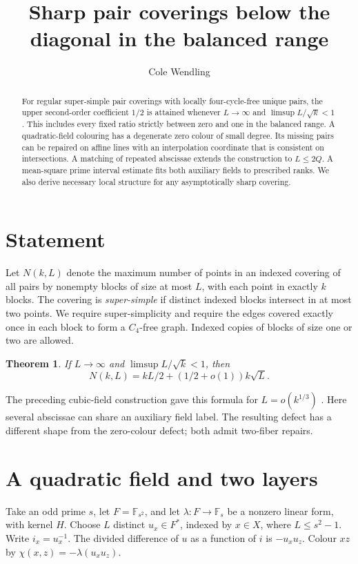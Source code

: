 \documentclass[10pt]{article}
\title{Sharp pair coverings below the diagonal in the balanced range}
\author{Cole Wendling}
\date{}
\newtheorem{theorem}{Theorem}
\newcommand{\F}{\mathbb F}
\begin{document}
\maketitle
\begin{abstract}
For regular super-simple pair coverings with locally four-cycle-free unique pairs, the upper second-order coefficient $1/2$ is attained whenever $L\to\infty$ and $\limsup L/\sqrt k<1$. This includes every fixed ratio strictly between zero and one in the balanced range. A quadratic-field colouring has a degenerate zero colour of small degree. Its missing pairs can be repaired on affine lines with an interpolation coordinate that is consistent on intersections. A matching of repeated abscissae extends the construction to $L\le2Q$. A mean-square prime interval estimate fits both auxiliary fields to prescribed ranks. We also derive necessary local structure for any asymptotically sharp covering.
\end{abstract}

\section{Statement}
Let $N(k,L)$ denote the maximum number of points in an indexed covering of all pairs by nonempty blocks of size at most $L$, with each point in exactly $k$ blocks. The covering is \emph{super-simple} if distinct indexed blocks intersect in at most two points. We require super-simplicity and require the edges covered exactly once in each block to form a $C_4$-free graph. Indexed copies of blocks of size one or two are allowed.
\begin{theorem}\label{main}
If $L\to\infty$ and $\limsup L/\sqrt{k}<1$, then
\[
 N(k,L)=kL/2+(1/2+o(1))k\sqrt L .
\]
\end{theorem}
The preceding cubic-field construction gave this formula for $L=o(k^{1/3})$ \cite{paper}. Here several abscissae can share an auxiliary field label. The resulting defect has a different shape from the zero-colour defect; both admit two-fiber repairs.

\section{A quadratic field and two layers}
Take an odd prime $s$, let $F=\F_{s^2}$, and let $\lambda:F\to\F_s$ be a nonzero linear form, with kernel $H$. Choose $L$ distinct $u_x\in F^*$, indexed by $x\in X$, where $L\le s^2-1$. Write $i_x=u_x^{-1}$. The divided difference of $u$ as a function of $i$ is $-u_xu_z$. Colour $xz$ by $\chi(x,z)=-\lambda(u_xu_z)$.
\end{document}
